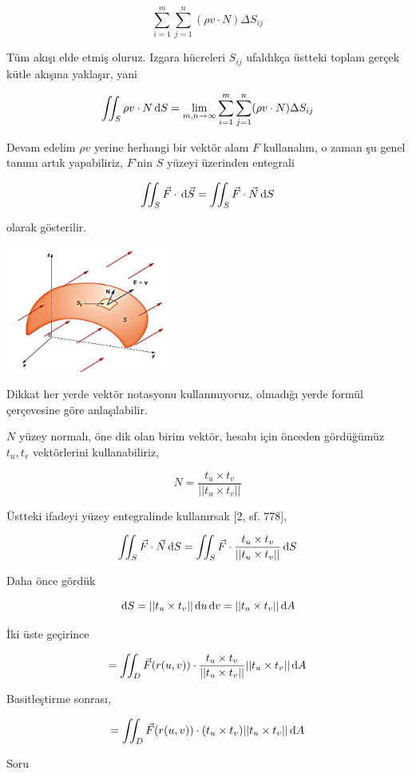 \documentclass[12pt,fleqn]{article}\usepackage{../../common}
\begin{document}
$$
\sum_{i=1}^{m} \sum_{j=1}^{n} (\rho v \cdot N) \Delta S_{ij}
$$

Tüm akışı elde etmiş oluruz. Izgara hücreleri $S_{ij}$ ufaldıkça üstteki toplam
gerçek kütle akışına yaklaşır, yani

$$
\iint_S \rho v \cdot N \,\mathrm{d} S = \lim_{m,n \to \infty}
\sum_{i=1}^{m} \sum_{j=1}^{n} (\rho v \cdot N) \Delta S_{ij}
$$

Devam edelim $\rho v$ yerine herhangi bir vektör alanı $F$ kullanalım, o zaman
şu genel tanımı artık yapabiliriz, $F$'nin $S$ yüzeyi üzerinden entegrali

$$
\iint_S \vec{F} \cdot \,\mathrm{d} \vec{S} = \iint_S \vec{F} \cdot \vec{N} \,\mathrm{d} S
$$

olarak gösterilir.

\includegraphics[width=15em]{calc_multi_75_app_05.jpg}

Dikkat her yerde vektör notasyonu kullanmıyoruz, olmadığı yerde formül
çerçevesine göre anlaşılabilir.

$N$ yüzey normalı, öne dik olan birim vektör, hesabı için önceden gördüğümüz
$t_u,t_v$ vektörlerini kullanabiliriz,

$$
N = \frac{t_u \times t_v}{ || t_u \times t_v || }
$$

Üstteki ifadeyi yüzey entegralinde kullanırsak [2, sf. 778],

$$
\iint_S \vec{F} \cdot \vec{N} \,\mathrm{d} S =
\iint_S \vec{F} \cdot \frac{t_u \times t_v}{ || t_u \times t_v || } \,\mathrm{d} S
$$

Daha önce gördük

$$
\,\mathrm{d} S = || t_u \times t_v || \,\mathrm{d} u \,\mathrm{d} v = || t_u \times t_v || \,\mathrm{d} A
$$

İki üste geçirince

$$
= \iint_D \vec{F}(r(u,v)) \cdot \frac{t_u \times t_v}{ || t_u \times t_v || }
|| t_u \times t_v || \,\mathrm{d} A
$$

Basitleştirme sonrası,

$$
= \iint_D \vec{F}(r(u,v)) \cdot (t_u \times t_v) || t_u \times t_v || \,\mathrm{d} A
$$

Soru
\end{document}

